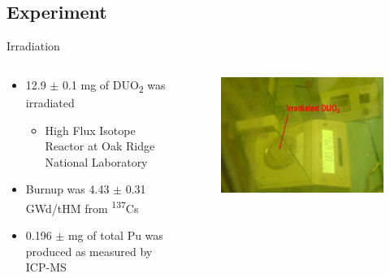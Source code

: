 \documentclass{beamer}
\newcommand{\tss}{\textsuperscript}
\newcommand{\tsbs}{\textsubscript}
\begin{document}
\subsection{Experiment}
\begin{frame}{Irradiation}
  \begin{columns}
    \begin{column}{0.5\textwidth}
      \vspace{-1cm}
      \begin{itemize}
      \item{12.9 $\pm$ 0.1 mg of DUO\tsbs{2} was irradiated}
        \begin{itemize}
        \item{High Flux Isotope Reactor at Oak Ridge National Laboratory}
        \end{itemize}
      \item{Burnup was 4.43 $\pm$ 0.31 GWd/tHM\tss{\cite{swinney2015experimental}}
       from \tss{137}Cs}
      \item{0.196 $\pm$ mg of total Pu was produced as measured by ICP-MS}
      \end{itemize}
    \end{column}
    \begin{column}{0.5\textwidth}
      \begin{figure}[H]
        \vspace*{-1cm}
        \begin{center}
	   \includegraphics[scale = 0.4]{figures/irradiated}
	\end{center}
      \end{figure}
    \end{column}
  \end{columns}  
  \end{frame}
\end{document}
